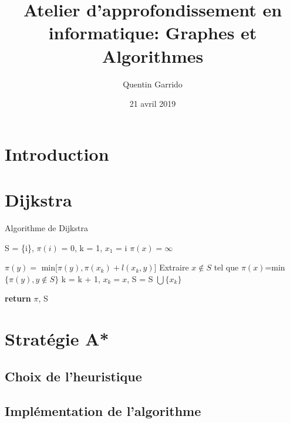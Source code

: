 \documentclass{article}
\title{Atelier d'approfondissement en informatique: Graphes et Algorithmes}
\author{Quentin Garrido}
\date{21 avril 2019}
\begin{document}
\maketitle
\tableofcontents
\pagebreak

\section{Introduction}

\pagebreak
\section{Dijkstra}

\begin{algorithm}
\caption{Algorithme de Dijkstra}\label{dijkstra}
\begin{algorithmic}[1]
	\State S = \{i\}, $\pi(i)$ = 0, k = 1, $x_1$ = i
		\State $\pi(x) = \infty$
	\EndFor
	
			\State $\pi(y) = $ min[$\pi(y), \pi(x_k) + l(x_k, y)$]
		\EndFor
		\State Extraire $x \not\in S$ tel que $\pi(x)$=min$\{\pi(y), y \not\in S\}$
		\State k = k + 1, $x_k = x$, S = S $\bigcup \{x_k\}$
	\EndWhile
	
	\State \textbf{return} $\pi$, S
\EndProcedure
\end{algorithmic}
\end{algorithm}

\pagebreak
\section{Stratégie A*}

\subsection{Choix de l'heuristique}

\subsection{Implémentation de l'algorithme}
\end{document}
